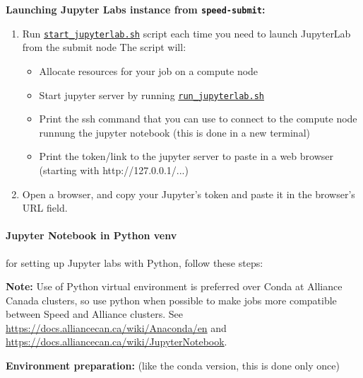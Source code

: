 \textbf{Launching Jupyter Labs instance from \texttt{speed-submit}:}
\begin{enumerate}
    \item Run \href{https://github.com/NAG-DevOps/speed-hpc/blob/master/src/jupyter/jupyterlabs-conda/start_jupyterlab.sh}{\texttt{start\_jupyterlab.sh}} script each time you need to launch JupyterLab from the submit node
    The script will:
    \begin{itemize}
        \item Allocate resources for your job on a compute node
        \item Start jupyter server by running \href{https://github.com/NAG-DevOps/speed-hpc/blob/master/src/jupyter/jupyterlabs-conda/run_jupyterlab.sh}{\texttt{run\_jupyterlab.sh}}
        \item Print the ssh command that you can use to connect to the compute node runnung the jupyter notebook (this is done in a new terminal)
        \item Print the token/link to the jupyter server to paste in a web browser (starting with http://127.0.0.1/...)
    \end{itemize}

    \item Open a browser, and copy your Jupyter's token and paste it in the browser's URL field.
\end{enumerate}

\paragraph{Jupyter Notebook in Python venv}
\label{sect:jupyter-python}
for setting up Jupyter labs with Python, follow these steps:

\textbf{Note:} Use of Python virtual environment is preferred over Conda at Alliance Canada clusters, so use python when possible to make jobs more compatible between Speed and Alliance clusters.
See \url{https://docs.alliancecan.ca/wiki/Anaconda/en}
and \url{https://docs.alliancecan.ca/wiki/JupyterNotebook}.

\textbf{Environment preparation:} (like the conda version, this is done only once)

